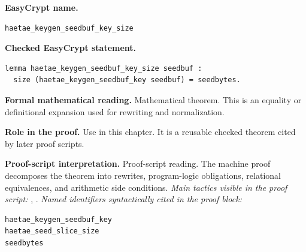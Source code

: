 \begin{formaltheorem}
\noindent\textbf{EasyCrypt name.}
\begin{lstlisting}[language=EasyCrypt,basicstyle=\ttfamily\scriptsize]
haetae_keygen_seedbuf_key_size
\end{lstlisting}
\noindent\textbf{Checked EasyCrypt statement.}
\begin{lstlisting}[language=EasyCrypt,basicstyle=\ttfamily\scriptsize]
lemma haetae_keygen_seedbuf_key_size seedbuf :
  size (haetae_keygen_seedbuf_key seedbuf) = seedbytes.
\end{lstlisting}
\noindent\textbf{Formal mathematical reading.}
Mathematical theorem. This is an equality or definitional expansion used for rewriting and normalization.

\noindent\textbf{Role in the proof.}
Use in this chapter. It is a reusable checked theorem cited by later proof scripts.

\noindent\textbf{Proof-script interpretation.}
Proof-script reading. The machine proof decomposes the theorem into rewrites, program-logic obligations, relational equivalences, and arithmetic side conditions.
\emph{Main tactics visible in the proof script:} , .
\emph{Named identifiers syntactically cited in the proof block:}
\begin{lstlisting}[language=EasyCrypt,basicstyle=\ttfamily\scriptsize]
haetae_keygen_seedbuf_key
haetae_seed_slice_size
seedbytes
\end{lstlisting}

\end{formaltheorem}

